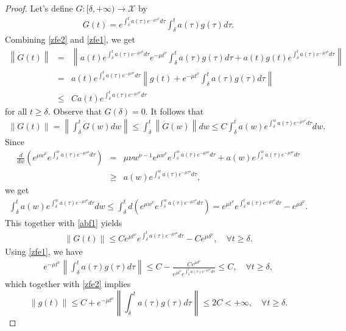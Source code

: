 \documentclass[review]{elsarticle}
\begin{document}
	\begin{proof}
		Let's define $G : [\delta, +\infty)\rightarrow  \mathcal{X}$ by 
		\begin{eqnarray}\label{zfe1}
			G(t)=e^{\int_{\delta}^{t}a(\tau)e^{-\mu\tau^{\nu}}d\tau}\int_{\delta}^{t}a(\tau)g(\tau)d\tau.
		\end{eqnarray}
		Combining \eqref{zfe2} and \eqref{zfe1}, we get
		\begin{eqnarray*}
			\left\|\dot{G}(t)\right\|&=&\left\|a(t)e^{\int_{\delta}^{t}a(\tau)e^{-\mu\tau^{\nu}}d\tau}e^{-\mu t^{\nu}}\int_{\delta}^{t}a(\tau)g(\tau)d\tau+a(t)g(t)e^{\int_{\delta}^{t}a(\tau)e^{-\mu\tau^{\nu}}d\tau}\right\|\\
			&=&a(t)e^{\int_{\delta}^{t}a(\tau)e^{-\mu\tau^{\nu}}d\tau}\left\|g(t)+e^{-\mu t^{\nu}}\int_{\delta}^{t}a(\tau)g(\tau)d\tau\right\|\\
			&\leq&Ca(t)e^{\int_{\delta}^{t}a(\tau)e^{-\mu\tau^{\nu}}d\tau}
		\end{eqnarray*}
		 for all $t\geq \delta$.
		Observe that  $G(\delta)=0$. It follows that
		\begin{eqnarray}\label{abf1}
			\left\|G(t)\right\|=\left\|\int_{\delta}^{t}\dot{G}(w)dw\right\|\leq\int_{\delta}^{t}\left\|\dot{G}(w)\right\|dw\leq C\int_{\delta}^{t}a(w)e^{\int_{\delta}^{w}a(\tau)e^{-\mu\tau^{\nu}}d\tau}dw.
		\end{eqnarray}
		Since
		\begin{eqnarray*}
			\frac{d}{dw}\left(e^{\mu w^{\nu}}e^{\int_{\delta}^{w}a(\tau)e^{-\mu\tau^{\nu}}d\tau}\right)&=&\mu \nu w^{\nu-1}e^{\mu w^{\nu}}e^{\int_{\delta}^{w}a(\tau)e^{-\mu\tau^{\nu}}d\tau}+a(w)e^{\int_{\delta}^{w}a(\tau)e^{-\mu\tau^{\nu}}d\tau}\\
			&\geq&a(w)e^{\int_{\delta}^{w}a(\tau)e^{-\mu\tau^{\nu}}d\tau},
		\end{eqnarray*}
		we get
		\begin{eqnarray*}
			\int_{\delta}^{t}a(w)e^{\int_{\delta}^{w}a(\tau)e^{-\mu\tau^{\nu}}d\tau}dw\leq\int_{\delta}^{t}d\left(e^{\mu w^{\nu}}e^{\int_{\delta}^{w}a(\tau)e^{-\mu\tau^{\nu}}d\tau}\right)=e^{\mu t^{\nu}}e^{\int_{\delta}^{t}a(\tau)e^{-\mu\tau^{\nu}}d\tau}-e^{\mu\delta^{\nu}}.
		\end{eqnarray*}
This together with \eqref{abf1} yields
		\begin{eqnarray*}
			\left\|G(t)\right\|\leq Ce^{\mu t^{\nu}}e^{\int_{\delta}^{t}a(\tau)e^{-\mu\tau^{\nu}}d\tau}-Ce^{\mu\delta^{\nu}},\quad\forall t\ge \delta.
		\end{eqnarray*}
Using \eqref{zfe1}, we have 
		\begin{eqnarray*}
			e^{-\mu t^{\nu}}\left\|\int_{\delta}^{t}a(\tau)g(\tau)d\tau\right\|\leq C-\frac{Ce^{\mu\delta^{\nu}}}{e^{\mu t^{\nu}}e^{\int_{\delta}^{t}a(\tau)e^{-\mu\tau^{\nu}}d\tau}}\leq C, \quad\forall t\ge \delta,
		\end{eqnarray*}
		which together with \eqref{zfe2} implies 
		$$\left\|g(t)\right\|\leq C+e^{-\mu t^{\nu}}\left\|\int_{\delta}^{t}a(\tau)g(\tau)d\tau\right\|\leq 2C<+\infty, \quad \forall t\geq \delta.$$
		\end{proof}
\end{document}
